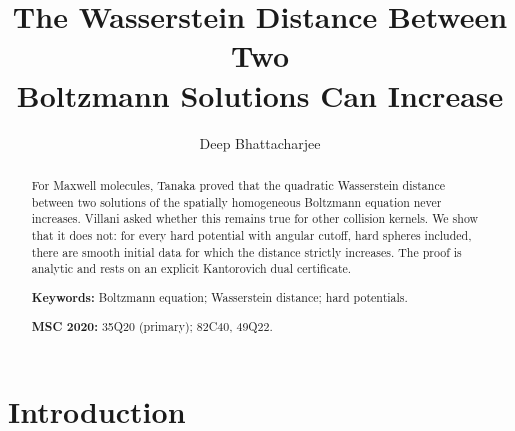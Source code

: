 \documentclass[11pt]{amsart}
\theoremstyle{definition}
\begin{document}
\title[Wasserstein distance along the Boltzmann flow]{The Wasserstein Distance Between Two\\ Boltzmann Solutions Can Increase}

\author{Deep Bhattacharjee}
\address{Formerly, Electro-Gravitational Space Propulsion Laboratory (EGSPL), Bhubaneswar, Odisha 751030, India}
\address{Formerly, University of Calcutta (Heramba Chandra College), 23/49 Gariahat Road, Golpark, Kolkata 700029, West Bengal, India}

\begin{abstract}
For Maxwell molecules, Tanaka proved that the quadratic Wasserstein distance between two solutions of the spatially homogeneous Boltzmann equation never increases. Villani asked whether this remains true for other collision kernels. We show that it does not: for every hard potential with angular cutoff, hard spheres included, there are smooth initial data for which the distance strictly increases. The proof is analytic and rests on an explicit Kantorovich dual certificate.

\medskip\noindent\textbf{Keywords:} Boltzmann equation; Wasserstein distance; hard potentials.

\smallskip\noindent\textbf{MSC 2020:} 35Q20 (primary); 82C40, 49Q22.
\end{abstract}

\maketitle

\section{Introduction}\label{sec:intro}
\end{document}
